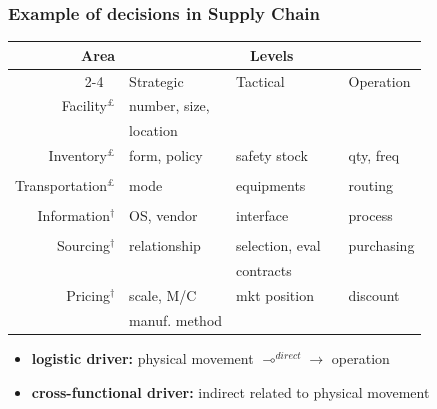 \documentclass[10pt,handout,notes=show]{beamer}
\begin{document}
\begin{frame}
  \frametitle{Example of decisions in Supply Chain}

  \begin{center}\small{
  \begin{tabular}{rlll} \hline \hline
    Area                      & \multicolumn{3}{c}{ \textbf{Levels} } \\ \cline{2-4}
    ~                         & Strategic         & Tactical          & Operation \\ \hline \hline
    Facility$^\pounds$           & number, size,     &                   &            \\
                              & location          &                   &  \\
    Inventory$^\pounds$          & form, policy      & safety stock      & qty, freq \\
                              &                   &                   &  \\
    Transportation$^\pounds$     & mode              & equipments        & routing \\
                              &                   &                   &  \\[6pt]
    Information$^\dag$        & OS, vendor        & interface         & process \\
                              &                   &                   &  \\
    Sourcing$^\dag$           & relationship~~    & selection, eval~~ & purchasing\\
                              &                   & contracts         &  \\
    Pricing$^\dag$            & scale, M/C        & mkt position      &  discount \\
                              & manuf. method     &                   &  \\    \hline \hline
  \end{tabular}
  }
  \end{center}

  \begin{flushleft}
    \begin{itemize}
      \item[] \code{$^\pounds$} \footnotesize{ \textbf{logistic driver:} physical movement $\multimap^{direct}\rightarrow$ operation }
      \item[] \code{$^\dag$} \footnotesize{ \textbf{cross-functional driver:} indirect related to physical movement  }
    \end{itemize}
  \end{flushleft}


\end{frame}
\end{document}
